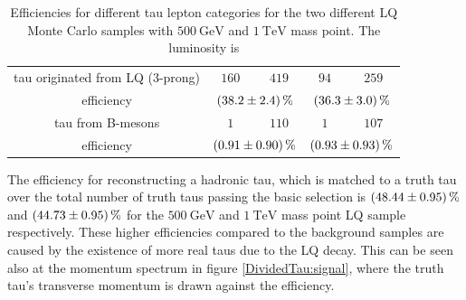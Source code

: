 \begin{table}
\begin{tabular*}{\linewidth}{@{\extracolsep{\fill}}ccccc}
		\hline
                tau originated from LQ (3-prong)& $160$        & $419$         & $94$          & $259$
		\\
		efficiency                  & \multicolumn{2}{c}{$\SI{38.2\pm 2.4}{\percent}$}   & \multicolumn{2}{c}{$\SI{36.3\pm 3.0}{\percent}$}
		\\
		\hline
		tau from B-mesons           & $1$            & $110$      & $1$            & $107$ 
		\\
		efficiency                  & \multicolumn{2}{c}{$\SI{0.91\pm 0.90}{\percent}$}   & \multicolumn{2}{c}{$\SI{0.93\pm 0.93}{\percent}$}
		\\
		\hline
		\hline
		\end{tabular*}
		\caption[Efficiencies for the two LQ samples with $\SI{500}{\giga\electronvolt}$ and $\SI{1}{\tera\electronvolt}$ mass point.]{Efficiencies for different tau lepton categories for the two different LQ Monte Carlo samples with $\SI{500}{\giga\electronvolt}$ and $\SI{1}{\tera\electronvolt}$ mass point. The luminosity is}
		\label{LQEffTable}
                \renewcommand{\arraystretch}{1}
                \end{table}
%
The efficiency for reconstructing a hadronic tau, which is matched to a truth tau over the total number of truth taus passing the basic selection is $\SI{48.44\pm 0.95}{\percent}$ and $\SI{44.73\pm 0.95}{\percent}$ for the $\SI{500}{\giga\electronvolt}$ and $\SI{1}{\tera\electronvolt}$ mass point LQ sample respectively. These higher efficiencies compared to the background samples are caused by the existence of more real taus due to the LQ decay. This can be seen also at the momentum spectrum in figure \ref{DividedTau:signal}, where the truth tau's transverse momentum is drawn against the efficiency.\par  
